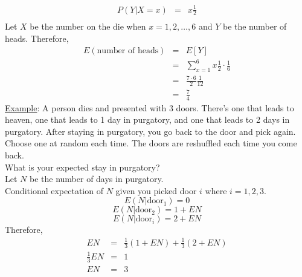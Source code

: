     \begin{eqnarray*}
      P(Y | X = x) & = & x \frac{1}{2}\\
    \end{eqnarray*}
    Let $X$ be the number on the die when $x = 1, 2, \ldots, 6$ and $Y$
    be the number of heads.
    Therefore, 
    \begin{eqnarray*}
      E(\text{number of heads}) & = & E[Y]\\
      & = & \sum_{x = 1}^6 x \frac{1}{2} \cdot \frac{1}{6}\\
      & = & \frac{7 \cdot 6}{2} \frac{1}{12}\\
      & = & \frac{7}{4}
    \end{eqnarray*}
    \underline{Example}: A person dies and presented with 3 doors. There's
      one that leads to heaven, one that leads to 1 day in purgatory, and one
      that leads to 2 days in purgatory. After staying in purgatory, you go
      back to the door and pick again.  Choose one at random each time. 
      The doors are reshuffled each time you come back.\\
      What is your expected stay in purgatory?\\
      Let $N$ be the number of days in purgatory.\\
      Conditional expectation of $N$ given you picked door $i$ where $i = 
      1,2,3$.\\
      $$
        E(N | \text{door}_1) = 0
      $$ 
      $$
        E(N | \text{door}_2) = 1 + EN
      $$
      $$
        E(N | \text{door}_i) = 2 + EN
      $$
      Therefore,
      \begin{eqnarray*}
        EN & = & \frac{1}{3}(1 + EN) + \frac{1}{3}(2 + EN)\\
        \frac{1}{3} EN & = & 1\\
        EN & = & 3
      \end{eqnarray*}
